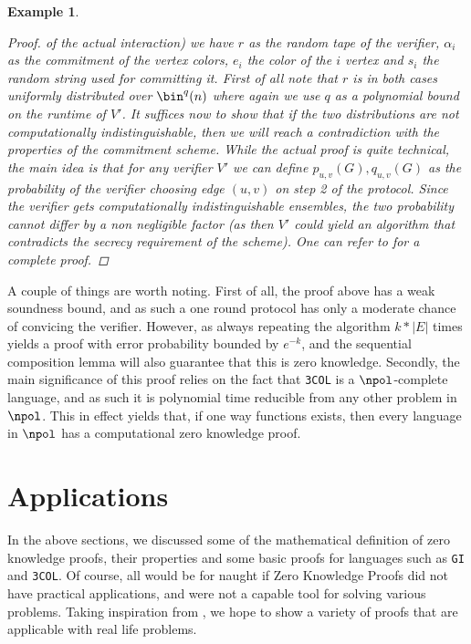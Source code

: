 \documentclass{article}
\newtheorem{example}{Example}
\begin{document}
\begin{example}
\begin{proof}
        of the actual interaction)
        we have $r$ as the random tape of the verifier, $\alpha_i$ as the commitment of the vertex colors, $e_i$ the color of the $i$ vertex and $s_i$ the
        random string used for committing it. First of all note that $r$ is in both cases uniformly distributed over $\bin^q(n)$ where again we
        use $q$ as a polynomial bound on the runtime of $V'$. It suffices now to show that if the two distributions are
        not computationally indistinguishable, then we will reach a contradiction with the properties of the commitment scheme.
        While the actual proof is quite technical, the main idea is that for any verifier $V'$ we can
        define $p_{u, v}(G), q_{u,v}(G)$ as the probability of the verifier choosing edge $(u,v)$ on step 2 of the protocol.
        Since the verifier gets computationally indistinguishable ensembles, the two probability cannot differ by a non negligible factor
        (as then $V'$ could yield an algorithm that contradicts the secrecy requirement of the scheme). One can refer to \cite{goldreichFoundationsCryptographyVol2007}
        for a complete proof.

    \end{proof}
\end{example}

A couple of things are worth noting. First of all, the proof above has a weak soundness bound, and as such
a one round protocol has only a moderate chance of convicing the verifier. However, as always repeating the
algorithm $k * |E|$ times yields a proof with error probability bounded by $e^{-k}$, and the sequential composition lemma will
also guarantee that this is zero knowledge. Secondly, the main significance of this proof relies on the fact that
\texttt{3COL} is a $\npol$-complete language, and as such it is polynomial time reducible from any other problem in $\npol$.
This in effect yields that, if one way functions exists, then every language in $\npol$ has a computational zero knowledge proof.

\section{Applications}
\label{applications}
In the above sections, we discussed some of the mathematical definition of zero knowledge proofs, their properties and some basic
proofs for languages such as \texttt{GI} and \texttt{3COL}. Of course, all would be for naught if Zero Knowledge Proofs
did not have practical applications, and were not a capable tool for solving various problems.
Taking inspiration from \cite{moraisSurveyZeroKnowledge2019}, we hope to show a variety of proofs that
are applicable with real life problems.
\end{document}
